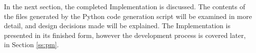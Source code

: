 \vspace{2em}
\noindent In the next section, the completed Implementation is discussed. The contents of the files generated by the Python code generation script will be examined in more detail, and design decisions made will be explained. The Implementation is presented in its finished form, however the development process is covered later, in Section \ref{ss:pm}.
